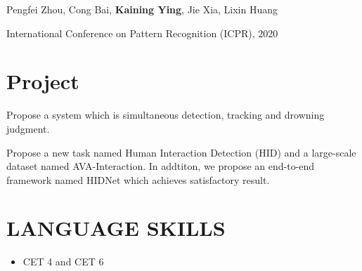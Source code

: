\documentclass{resume}
\begin{document}
Pengfei Zhou, Cong Bai, \textbf{Kaining Ying}, Jie Xia, Lixin Huang

International Conference on Pattern Recognition (ICPR), 2020




\section{Project}
Propose a system which is simultaneous detection, tracking and drowning judgment.

Propose a new task named Human Interaction Detection (HID) and a large-scale dataset named AVA-Interaction. In addtiton, we propose an end-to-end framework named HIDNet which achieves satisfactory result.

\section{LANGUAGE SKILLS}
\begin{itemize}
  \item CET 4 and CET 6
\end{itemize}


%
%
\end{document}
